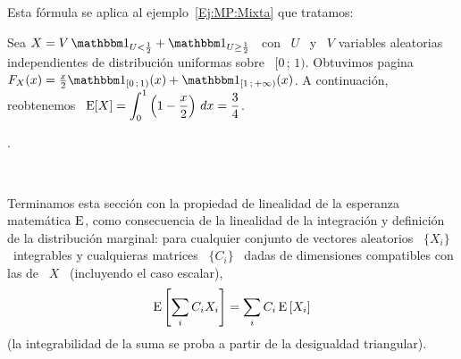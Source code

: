 Esta f\'ormula se aplica al ejemplo~\ref{Ej:MP:Mixta} que tratamos:
%
\begin{ejemplo}\label{Ej:MP:EspMixtaPositiva}
  Sea $X = V \,  \un_{U < \frac12} + \un_{U \ge \frac12}$ \ con  \ $U$ \ y \ $V$
  variables aleatorias independientes de distribuci\'on uniformas sobre \ $[0 \,
  ;  \,  1)$. Obtuvimos  pagina~\pageref{Ej:MP:Mixta}  \  $F_X(x) =  \frac{x}{2}
  \un_{[0 \,  ; \, 1)}(x)  + \un_{[1 \,  ; \, +\infty)}(x)$.   A continuaci\'on,
  reobtenemos \ $\displaystyle \operatorname{E}[X] = \int_0^1 \left( 1 - \frac{x}{2} \right)
  \, dx = \frac34$.
\end{ejemplo}.

\

Terminamos  esta  secci\'on con  la  propiedad  de  linealidad de  la  esperanza
matem\'atica $\operatorname{E}$,  como consecuencia de  la linealidad de la  integraci\'on y
definici\'on de la distribuci\'on  marginal: para cualquier conjunto de vectores
aleatorios \ $\{  X_i \}$ \ integrables  y cualquieras matrices \ $\{  C_i \}$ \
dadas  de  dimensiones compatibles  con  las  de \  $X$  \  (incluyendo el  caso
escalar),
%
\[
\operatorname{E}\left[ \sum_i C_i X_i \right] = \sum_i C_i \operatorname{E}\left[ X_i \right]
\]
%
(la integrabilidad de la suma se proba a partir de la desigualdad triangular).




\label{Ssec:MP:Momentos}


